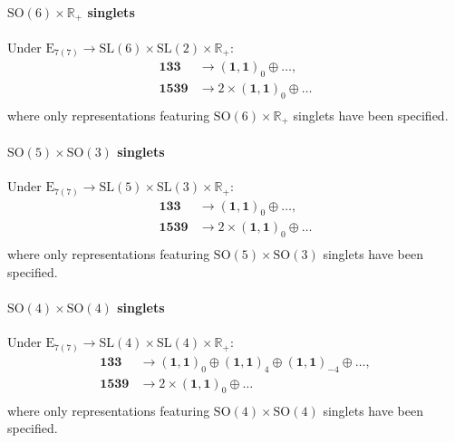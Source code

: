 \documentclass[11pt]{article}
\newcommand{\SO}{\ensuremath{\mathrm{SO}}\xspace}
\newcommand{\SL}{\ensuremath{\mathrm{SL}}\xspace}
\newcommand{\E}{\ensuremath{\mathrm{E}}\xspace}
\newcommand{\R}{\ensuremath{\mathbb{R}}\xspace}
\begin{document}
\paragraph{\boldmath $\SO(6)\times\R_{+}$ singlets}
Under $\E_{7(7)}\rightarrow\SL(6)\times\SL(2)\times\R_{+}$:
\begin{equation}
  \begin{aligned}
    \bm{133} & \longrightarrow (\bm{1},\bm{1})_{0} \oplus \ldots,\\
    \bm{1539} & \longrightarrow 2\times(\bm{1},\bm{1})_{0} \oplus \ldots\\
  \end{aligned}
\end{equation}
where only representations featuring $\SO(6)\times\R_{+}$ singlets have been specified.

\paragraph{\boldmath $\SO(5)\times\SO(3)$ singlets}
Under $\E_{7(7)}\rightarrow\SL(5)\times\SL(3)\times\R_{+}$:
\begin{equation}
  \begin{aligned}
    \bm{133} & \longrightarrow (\bm{1},\bm{1})_{0} \oplus \ldots,\\
    \bm{1539} & \longrightarrow 2\times(\bm{1},\bm{1})_{0} \oplus \ldots\\
  \end{aligned}
\end{equation}
where only representations featuring $\SO(5)\times\SO(3)$ singlets have been specified.

\paragraph{\boldmath $\SO(4)\times\SO(4)$ singlets}
Under $\E_{7(7)}\rightarrow\SL(4)\times\SL(4)\times\R_{+}$:
\begin{equation}
  \begin{aligned}
    \bm{133} & \longrightarrow (\bm{1},\bm{1})_{0} \oplus (\bm{1},\bm{1})_{4} \oplus (\bm{1},\bm{1})_{-4} \oplus \ldots,\\
    \bm{1539} & \longrightarrow 2\times(\bm{1},\bm{1})_{0} \oplus \ldots\\
  \end{aligned}
\end{equation}
where only representations featuring $\SO(4)\times\SO(4)$ singlets have been specified.
\end{document}
